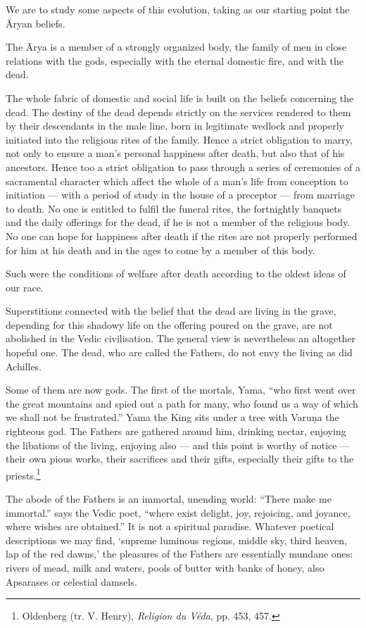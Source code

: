 \documentclass[a4paper, 11pt, oneside, english]{article}
\begin{document}
We are to study some aspects of this evolution, taking as our starting point the Āryan beliefs.

The Ārya is a member of a strongly organized body, the family of men in close relations with the gods, especially with the eternal domestic fire, and with the dead.

The whole fabric of domestic and social life is built on the beliefs concerning the dead. The destiny of the dead depends strictly on the services rendered to them by their descendants in the male line, born in legitimate wedlock and properly initiated into the religious rites of the family. Hence a strict obligation to marry, not only to ensure a man's personal happiness after death, but also that of his ancestors. Hence too a strict obligation to pass through a series of ceremonies of a sacramental character which affect the whole of a man's life from conception to initiation --- with a period of study in the house of a preceptor --- from marriage to death. No one is entitled to fulfil the funeral rites, the fortnightly banquets and the daily offerings for the dead, if he is not a member of the religious body. No one can hope for happiness after death if the rites are not properly performed for him at his death and in the ages to come by a member of this body.

Such were the conditions of welfare after death according to the oldest ideas of our race.

Superstitions connected with the belief that the dead are living in the grave, depending for this shadowy life on the offering poured on the grave, are not abolished in the Vedic civilisation. The general view is nevertheless an altogether hopeful one. The dead, who are called the Fathers, do not envy the living as did Achilles.

Some of them are now gods. The first of the mortals, Yama, ``who first went over the great mountains and spied out a path for many, who found us a way of which we shall not be frustrated.'' Yama the King sits under a tree with Varuṇa the righteous god. The Fathers are gathered around him, drinking nectar, enjoying the libations of the living, enjoying also --- and this point is worthy of notice --- their own pious works, their sacrifices and their gifts, especially their gifts to the priests.\footnote{Oldenberg (tr. V. Henry), \emph{Religion du Véda}, pp. 453, 457.}

The abode of the Fathers is an immortal, unending world: ``There make me immortal.'' says the Vedic poet, ``where exist delight, joy, rejoicing, and joyance, where wishes are obtained.'' It is not a spiritual paradise. Whatever poetical descriptions we may find, `supreme luminous regions, middle sky, third heaven, lap of the red dawns,' the pleasures of the Fathers are essentially mundane ones: rivers of mead, milk and waters, pools of butter with banks of honey, also Apsarases or celestial damsels.
\end{document}
